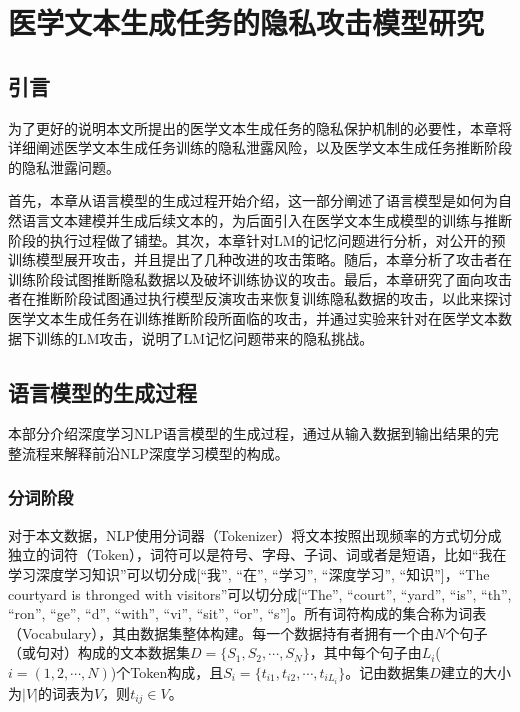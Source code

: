
\chapter{医学文本生成任务的隐私攻击模型研究}

\section{引言}

为了更好的说明本文所提出的医学文本生成任务的隐私保护机制的必要性，本章将详细阐述医学文本生成任务训练的隐私泄露风险，以及医学文本生成任务推断阶段的隐私泄露问题。

首先，本章从语言模型的生成过程开始介绍，这一部分阐述了语言模型是如何为自然语言文本建模并生成后续文本的，为后面引入在医学文本生成模型的训练与推断阶段的执行过程做了铺垫。其次，本章针对LM的记忆问题进行分析，对公开的预训练模型展开攻击，并且提出了几种改进的攻击策略。随后，本章分析了攻击者在训练阶段试图推断隐私数据以及破坏训练协议的攻击。最后，本章研究了面向攻击者在推断阶段试图通过执行模型反演攻击来恢复训练隐私数据的攻击，以此来探讨医学文本生成任务在训练推断阶段所面临的攻击，并通过实验来针对在医学文本数据下训练的LM攻击，说明了LM记忆问题带来的隐私挑战。

\section{语言模型的生成过程}

本部分介绍深度学习NLP语言模型的生成过程，通过从输入数据到输出结果的完整流程来解释前沿NLP深度学习模型的构成。

\subsection{分词阶段}

对于本文数据，NLP使用分词器（Tokenizer）将文本按照出现频率的方式切分成独立的词符（Token），词符可以是符号、字母、子词、词或者是短语，比如“我在学习深度学习知识”可以切分成[“我”, “在”, “学习”, “深度学习”, “知识”]，“The courtyard is thronged with visitors”可以切分成[“The”, “court”, “yard”, “is”, “th”, “ron”, “ge”, “d”, “with”, “vi”, “sit”, “or”, “s”]。所有词符构成的集合称为词表（Vocabulary），其由数据集整体构建。每一个数据持有者拥有一个由$N$个句子（或句对）构成的文本数据集$D=\{S_1,S_2,\cdots,S_N\}$，其中每个句子由$L_i$($i=(1,2,\cdots,N)$)个Token构成，且$S_i=\{t_{i1}, t_{i2}, \cdots,t_{iL_i}\}$。记由数据集$D$建立的大小为$|V|$的词表为$V$，则$t_{ij}\in V$。

